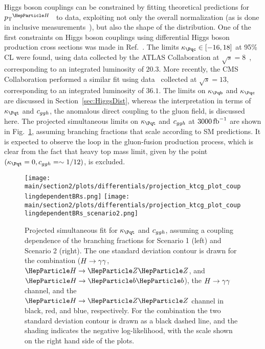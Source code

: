 
Higgs boson couplings can be constrained by fitting theoretical predictions for $\pTH$~\cite{Bishara:2016jga,Grazzini:2017szg,Grazzini:2016paz} to data, exploiting not only the overall normalization (as is done in inclusive measurements~\cite{%
Khachatryan:2016vau,%
Aad:2015zhl,%
CMS:2018lkl%
}), but also the shape of the distribution.
% 
One of the first constraints on Higgs boson couplings using differential Higgs boson production cross sections was made in Ref.~\cite{Bishara:2016jga}.
% 
The limits $\kappac \in [ -16, 18 ]$ at 95\% CL were found, using data collected by the ATLAS Collaboration at $\sqrt{s}=8$\UTeV~\cite{Aad:2015lha}, corresponding to an integrated luminosity of $20.3$\fbinv.
% 
More recently, the CMS Collaboration performed a similar fit using data~\cite{CMS-PAS-HIG-17-028} collected at $\sqrt{s}=13$\UTeV, corresponding to an integrated luminosity of $36.1$\fbinv.
% 
The limits on $\kappab$ and $\kappac$ are discussed in Section~\ref{sec:HiggsDist}, whereas the interpretation in terms of $\kappat$ and $c_{ggh}$, the anomalous direct coupling to the gluon field, is discussed here.
% 
The projected simultaneous limits on $\kappat$ and $c_{ggh}$ at $3000\mbox{\ensuremath{\,\text{fb}^\text{$-$1}}}$ are shown in Fig.~\ref{fig:ktcg_couplingdependentBRs}, assuming branching fractions that scale according to SM predictions.
% 
It is expected to observe the loop in the gluon-fusion production process, which is clear from the fact that heavy top mass limit, given by the point $(\kappat =0, \cg=\sim 1/12)$, is excluded.

\begin{figure}[hbtp]
  \begin{center}
    \texttt{[image: \\main/section2/plots/differentials/projection\_ktcg\_plot\_couplingdependentBRs.png]}
    \texttt{[image: \\main/section2/plots/differentials/projection\_ktcg\_plot\_couplingdependentBRs\_scenario2.png]}
    \caption{
        Projected simultaneous fit for $\kappat$ and $c_{ggh}$, assuming a coupling dependence of the branching fractions for Scenario 1 (left) and Scenario 2 (right).
        The one standard deviation contour is drawn for the combination ($H\rightarrow\gamma\gamma$, $\hzz$, and $\hbb$), the $H\rightarrow\gamma\gamma$ channel, and the $\hzz$ channel in black, red, and blue, respectively.
        For the combination the two standard deviation contour is drawn as a black dashed line, and the shading indicates the negative log-likelihood, with the scale shown on the right hand side of the plots.
        }
    \label{fig:ktcg_couplingdependentBRs}
  \end{center}
\end{figure}

